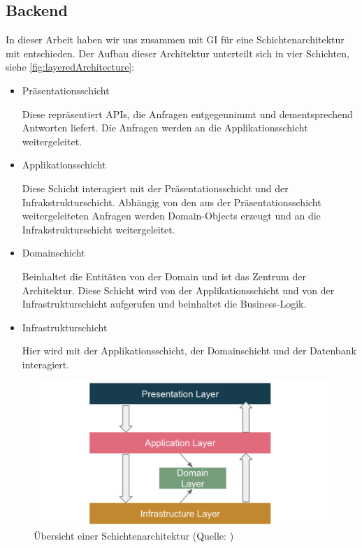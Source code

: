 \documentclass[a4paper, fontsize=11pt, parskip=half, twoside, headings=openright]{scrreprt}
\begin{document}
	\subsection{Backend} \label{subsec:backend}
	In dieser Arbeit haben wir uns zusammen mit \ac{GI} für eine Schichtenarchitektur mit  entschieden.
	Der Aufbau dieser Architektur unterteilt sich in vier Schichten, siehe \autoref{fig:layeredArchitecture}:
	
	\begin{itemize}
		\item Präsentationsschicht
		
		Diese repräsentiert \ac{API}s, die Anfragen entgegennimmt und dementsprechend Antworten liefert.
		Die Anfragen werden an die Applikationsschicht weitergeleitet.
		
		\item Applikationsschicht
		
		Diese Schicht interagiert mit der Präsentationsschicht und der Infrakstrukturschicht.
		Abhängig von den aus der Präsentationsschicht weitergeleiteten Anfragen werden Domain-Objects erzeugt und an die Infrakstrukturschicht weitergeleitet.
		
		\item Domainschicht
		
		Beinhaltet die Entitäten von der Domain und ist das Zentrum der Architektur.
		Diese Schicht wird von der Applikationsschicht und von der Infrastrukturschicht aufgerufen und beinhaltet die Business-Logik.
		
		\item Infrastrukturschicht
		
		Hier wird mit der Applikationsschicht, der Domainschicht und der Datenbank interagiert.
	\end{itemize}

	\begin{figure}[ht]
		\centering
		\includegraphics[scale=0.5]{assets/layeredArchitecture.png}
		\caption{Übersicht einer Schichtenarchitektur (Quelle: \textcite{zhang_domain_nodate})}
		\label{fig:layeredArchitecture}
	\end{figure}
	
\end{document}
